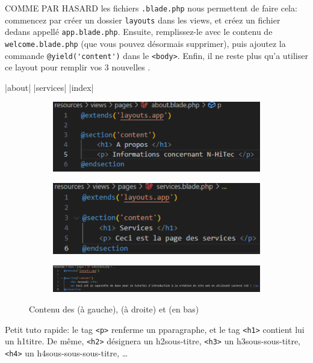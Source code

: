 COMME PAR HASARD les fichiers \verb|.blade.php| nous permettent de faire cela: commencez par créer un dossier \verb|layouts| dans les views, et créez un fichier dedans appellé \verb|app.blade.php|. Ensuite, remplissez-le avec le contenu de \verb|welcome.blade.php| (que vous pouvez désormais supprimer), puis ajoutez la commande \verb|@yield('content')| dans le \verb|<body>|. Enfin, il ne reste plus qu'a utiliser ce layout pour remplir vos 3 nouvelles \views{}.

|about|
|services|
|index|
\begin{figure}[!h]
    \centering
    \begin{subfigure}[b]{0.49\textwidth}
         \centering
         \includegraphics[width=\textwidth]{figures-C1/basic_about.pdf}
     \end{subfigure}
     \begin{subfigure}[b]{0.49\textwidth}
         \centering
         \includegraphics[width=\textwidth]{figures-C1/basic_services.pdf}
     \end{subfigure}
     \begin{subfigure}[b]{1\textwidth}
         \centering
         \includegraphics[width=\textwidth]{figures-C1/basic_accueil.pdf}
     \end{subfigure}
        \caption{Contenu des \views{} \protect{} (à gauche), \protect{} (à droite) et \protect{} (en bas)}
\end{figure}
Petit tuto \html{} rapide: le tag \verb|<p>| renferme un pparagraphe, et le tag \verb|<h1>| contient lui un h1titre. De même, \verb|<h2>| désignera un h2sous-titre, \verb|<h3>| un h3sous-sous-titre, \verb|<h4>| un h4sous-sous-sous-titre, \ldots

